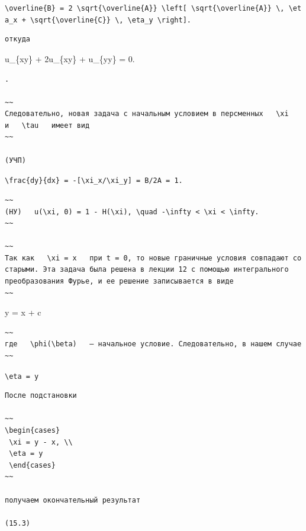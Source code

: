 \documentclass[
  ukrainian,
]{article}
\begin{document}
\texttt{\textbackslash{}overline\{B\}\ =\ 2\ \textbackslash{}sqrt\{\textbackslash{}overline\{A\}\}\ \textbackslash{}left{[}\ \textbackslash{}sqrt\{\textbackslash{}overline\{A\}\}\ \textbackslash{},\ \textbackslash{}eta\_x\ +\ \textbackslash{}sqrt\{\textbackslash{}overline\{C\}\}\ \textbackslash{},\ \textbackslash{}eta\_y\ \textbackslash{}right{]}.}

\begin{verbatim}
откуда
\end{verbatim}

u\_\{xy\} + 2u\_\{xy\} + u\_\{yy\} = 0.

\begin{verbatim}
.

~~
Следовательно, новая задача с начальным условием в персменных   \xi   и   \tau   имеет вид
~~

(УЧП)
\end{verbatim}

\texttt{\textbackslash{}frac\{dy\}\{dx\}\ =\ -{[}\textbackslash{}xi\_x/\textbackslash{}xi\_y{]}\ =\ B/2A\ =\ 1.}

\begin{verbatim}
~~
(НУ)   u(\xi, 0) = 1 - H(\xi), \quad -\infty < \xi < \infty.
~~

~~
Так как   \xi = x   при t = 0, то новые граничные условия совпадают со старыми. Эта задача была решена в лекции 12 с помощью интегрального преобразования Фурье, и ее решение записывается в виде
~~
\end{verbatim}

y = x + c

\begin{verbatim}
~~
где   \phi(\beta)   — начальное условие. Следовательно, в нашем случае
~~
\end{verbatim}

\texttt{\textbackslash{}eta\ =\ y}

\begin{verbatim}
После подстановки

~~
\begin{cases}
 \xi = y - x, \\
 \eta = y
 \end{cases}
~~

получаем окончательный результат

(15.3)
\end{verbatim}
\end{document}
